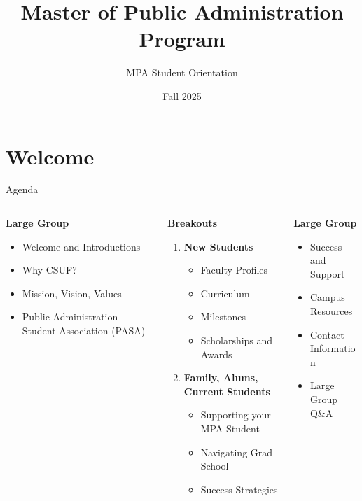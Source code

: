 \documentclass[10pt]{beamer}
\title{Master of Public Administration Program}
\subtitle{MPA Student Orientation}
\date{Fall 2025}
\begin{document}

\maketitle

\section{\textcolor{titanorange}{Welcome}}
\begin{frame}{Agenda}
\begin{columns}[T,totalwidth=\textwidth]
  \begin{column}{0.33\textwidth}
    \textbf{Large Group}
    \begin{itemize}\setlength{\itemsep}{2pt}
      \item Welcome and Introductions
      \item Why CSUF?
      \item Mission, Vision, Values
      \item Public Administration Student Association (PASA)
    \end{itemize}
  \end{column}

  \begin{column}{0.33\textwidth}
    \textbf{Breakouts}
    \begin{enumerate}\setlength{\itemsep}{2pt}
      \item \textbf{New Students}
        \begin{itemize}\setlength{\itemsep}{1pt}
          \item Faculty Profiles
          \item Curriculum
          \item Milestones
          \item Scholarships and Awards
        \end{itemize}
      \item \textbf{Family, Alums, Current Students}
        \begin{itemize}\setlength{\itemsep}{1pt}
          \item Supporting your MPA Student
          \item Navigating Grad School
          \item Success Strategies
        \end{itemize}
    \end{enumerate}
  \end{column}

  \begin{column}{0.33\textwidth}
    \textbf{Large Group}
    \begin{itemize}\setlength{\itemsep}{2pt}
      \item Success and Support
      \item Campus Resources
      \item Contact Information
      \item Large Group Q\&A
    \end{itemize}
  \end{column}
\end{columns}
\end{frame}
\end{document}
